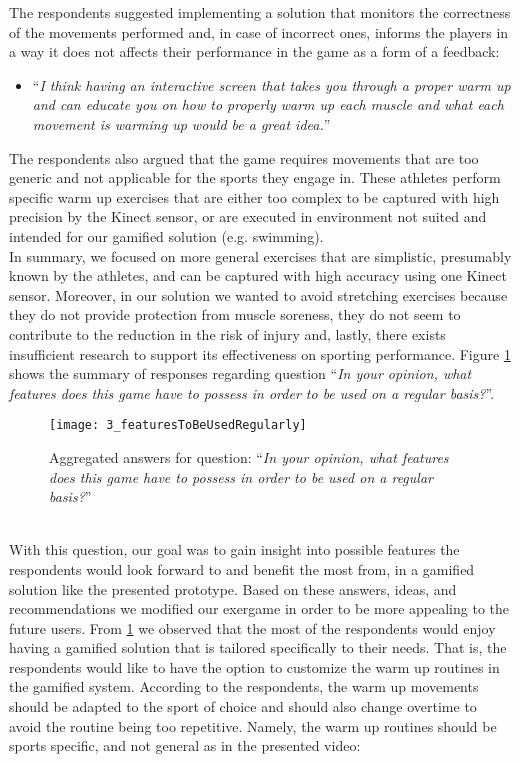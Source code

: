 The respondents suggested implementing a solution that monitors the correctness of the movements performed and, in case of incorrect ones, informs the players in a way it does not affects their performance in the game as a form of a feedback:
\begin{itemize}
\item ``\textit{I think having an interactive screen that takes you through a proper warm up and can educate you on how to properly warm up each muscle and what each movement is warming up would be a great idea.}''
\end{itemize}
The respondents also argued that the game requires movements that are too generic and not applicable for the sports they engage in. These athletes perform specific warm up exercises that are either too complex to be captured with high precision by the Kinect sensor, or are executed in environment not suited and intended for our gamified solution (e.g. swimming). \\In summary, we focused on more general exercises that are simplistic, presumably known by the athletes, and can be captured with high accuracy using one Kinect sensor. Moreover, in our solution we wanted to avoid stretching exercises because they do not provide protection from muscle soreness, they do not seem to contribute to the reduction in the risk of injury and, lastly, there exists insufficient research to support its effectiveness on sporting performance.  Figure \ref{fig:3_featuresToBeUsedRegularly} shows the summary of responses regarding question ``\textit{In your opinion, what features does this game have to possess in order to be used on a regular basis?}''.\\
\begin{figure}[h]
    \centering
    \texttt{[image: 3\_featuresToBeUsedRegularly]}
    \caption{Aggregated answers for question: ``\textit{In your opinion, what features does this game have to possess in order to be used on a regular basis?}''}
    \label{fig:3_featuresToBeUsedRegularly}
\end{figure}\\
With this question, our goal was to gain insight into possible features the respondents would look forward to and benefit the most from, in a gamified solution like the presented prototype. Based on these answers, ideas, and recommendations we modified our exergame in order to be more appealing to the future users. From \ref{fig:3_featuresToBeUsedRegularly} we observed that the most of the respondents would enjoy having a gamified solution that is tailored specifically to their needs. That is, the respondents would like to have the option to customize the warm up routines in the gamified system. According to the respondents, the warm up movements should be adapted to the sport of choice and should also change overtime to avoid the routine being too repetitive. Namely, the warm up routines should be sports specific, and not general as in the presented video:
